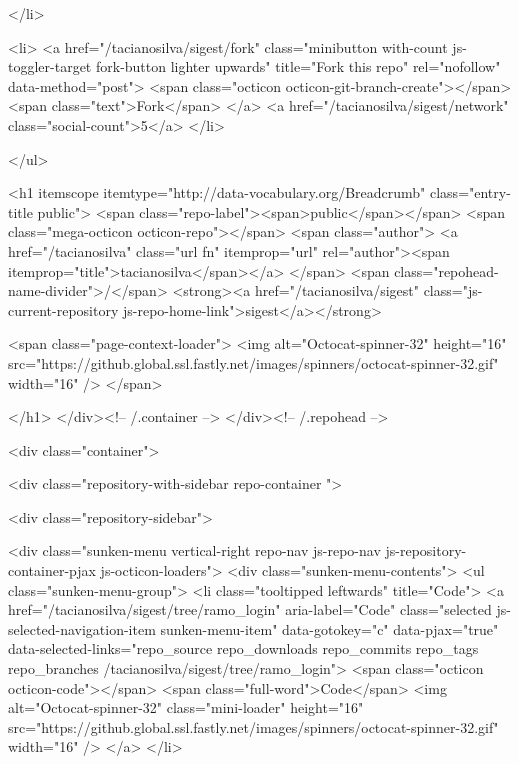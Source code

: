   </li>


        <li>
          <a href="/tacianosilva/sigest/fork" class="minibutton with-count js-toggler-target fork-button lighter upwards" title="Fork this repo" rel="nofollow" data-method="post">
            <span class="octicon octicon-git-branch-create"></span><span class="text">Fork</span>
          </a>
          <a href="/tacianosilva/sigest/network" class="social-count">5</a>
        </li>


</ul>

        <h1 itemscope itemtype="http://data-vocabulary.org/Breadcrumb" class="entry-title public">
          <span class="repo-label"><span>public</span></span>
          <span class="mega-octicon octicon-repo"></span>
          <span class="author">
            <a href="/tacianosilva" class="url fn" itemprop="url" rel="author"><span itemprop="title">tacianosilva</span></a>
          </span>
          <span class="repohead-name-divider">/</span>
          <strong><a href="/tacianosilva/sigest" class="js-current-repository js-repo-home-link">sigest</a></strong>

          <span class="page-context-loader">
            <img alt="Octocat-spinner-32" height="16" src="https://github.global.ssl.fastly.net/images/spinners/octocat-spinner-32.gif" width="16" />
          </span>

        </h1>
      </div><!-- /.container -->
    </div><!-- /.repohead -->

    <div class="container">

      <div class="repository-with-sidebar repo-container ">

        <div class="repository-sidebar">
            

<div class="sunken-menu vertical-right repo-nav js-repo-nav js-repository-container-pjax js-octicon-loaders">
  <div class="sunken-menu-contents">
    <ul class="sunken-menu-group">
      <li class="tooltipped leftwards" title="Code">
        <a href="/tacianosilva/sigest/tree/ramo_login" aria-label="Code" class="selected js-selected-navigation-item sunken-menu-item" data-gotokey="c" data-pjax="true" data-selected-links="repo_source repo_downloads repo_commits repo_tags repo_branches /tacianosilva/sigest/tree/ramo_login">
          <span class="octicon octicon-code"></span> <span class="full-word">Code</span>
          <img alt="Octocat-spinner-32" class="mini-loader" height="16" src="https://github.global.ssl.fastly.net/images/spinners/octocat-spinner-32.gif" width="16" />
</a>      </li>

